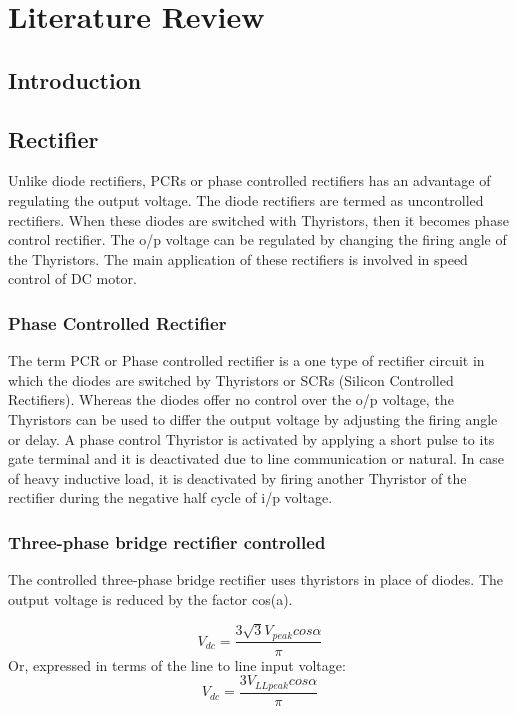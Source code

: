 
\chapter{Literature Review} %
\label{Chapter1}

\section{Introduction}
\section{Rectifier}
Unlike diode rectifiers, PCRs or phase controlled rectifiers
has an advantage of regulating the output voltage. The diode
rectifiers are termed as uncontrolled rectifiers. When 
these diodes are switched with Thyristors, then it becomes 
phase control rectifier. The o/p voltage can be regulated 
by changing the firing angle of the Thyristors. The main 
application of these rectifiers is involved in speed control 
of DC motor.
\subsection{Phase Controlled Rectifier}
The term PCR or Phase controlled rectifier is a one type of 
rectifier circuit in which the diodes are switched by Thyristors 
or SCRs (Silicon Controlled Rectifiers). Whereas the diodes offer
no control over the o/p voltage, the Thyristors can be used 
to differ the output voltage by adjusting the firing angle or 
delay. A phase control Thyristor is activated by applying a short 
pulse to its gate terminal and it is deactivated due to line 
communication or natural. In case of heavy inductive load, it is 
deactivated by firing another Thyristor of the rectifier during 
the negative half cycle of i/p voltage.

\subsection{Three-phase bridge rectifier controlled}
The controlled three-phase bridge rectifier uses thyristors in 
place of diodes. The output voltage is reduced by the factor cos(a).

\begin{equation}
	V_{dc}=\frac{3\sqrt{3}V_{peak} cos{\alpha} }{\pi}
\end{equation}
Or, expressed in terms of the line to line input voltage:
\begin{equation}
	V_{dc}=\frac{3V_{LLpeak} cos{\alpha} }{\pi}
\end{equation}

